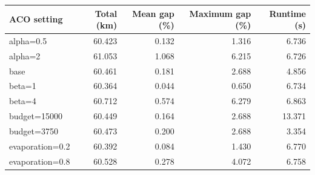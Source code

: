 \begin{tabular}{lrrrr}
\toprule
ACO setting & Total (km) & Mean gap (\%) & Maximum gap (\%) & Runtime (s) \\
\midrule
alpha=0.5 & 60.423 & 0.132 & 1.316 & 6.736 \\
alpha=2 & 61.053 & 1.068 & 6.215 & 6.726 \\
base & 60.461 & 0.181 & 2.688 & 4.856 \\
beta=1 & 60.364 & 0.044 & 0.650 & 6.734 \\
beta=4 & 60.712 & 0.574 & 6.279 & 6.863 \\
budget=15000 & 60.449 & 0.164 & 2.688 & 13.371 \\
budget=3750 & 60.473 & 0.200 & 2.688 & 3.354 \\
evaporation=0.2 & 60.392 & 0.084 & 1.430 & 6.770 \\
evaporation=0.8 & 60.528 & 0.278 & 4.072 & 6.758 \\
\bottomrule
\end{tabular}
